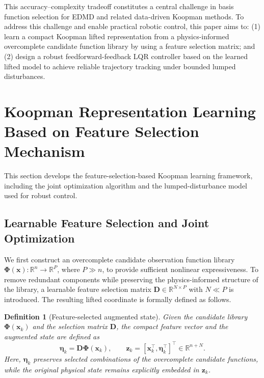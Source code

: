 \documentclass[letterpaper,10pt,conference]{ieeeconf}
\newtheorem{definition}{Definition}[section]
\newcommand{\R}{\mathbb{R}}
\newcommand{\x}{\mathbf{x}}
\newcommand{\z}{\mathbf{z}}
\newcommand{\Dmat}{\mathbf{D}}
\newcommand{\Phib}{\boldsymbol{\Phi}}
\begin{document}
This accuracy--complexity tradeoff constitutes a central challenge in basis function selection for EDMD and related data-driven Koopman methods. To address this challenge and enable practical robotic control, this paper aims to: (1) learn a compact Koopman lifted representation from a physics-informed overcomplete candidate function library by using a feature selection matrix; and (2) design a robust feedforward-feedback LQR controller based on the learned lifted model to achieve reliable trajectory tracking under bounded lumped disturbances.


\section{Koopman Representation Learning Based on Feature Selection Mechanism}
\label{sec:koopman}

This section develops the feature-selection-based Koopman learning framework, including the joint optimization algorithm and the lumped-disturbance model used for robust control.

\subsection{Learnable Feature Selection and Joint Optimization}
\label{subsec:algorithm}
We first construct an overcomplete candidate observation function library $\Phib(\x):\R^n\to\R^P$, where $P\gg n$, to provide sufficient nonlinear expressiveness. To remove redundant components while preserving the physics-informed structure of the library, a learnable feature selection matrix $\Dmat\in\R^{N\times P}$ with $N\ll P$ is introduced. The resulting lifted coordinate is formally defined as follows.

{
\begin{definition}[Feature-selected augmented state]
Given the candidate library $\Phib(\x_k)$ and the selection matrix $\Dmat$, the compact feature vector and the augmented state are defined as
\begin{equation}
\boldsymbol{\eta}_k = \Dmat\Phib(\x_k), \qquad
\z_k = [\x_k^\top, \boldsymbol{\eta}_k^\top]^\top \in \R^{n+N}.
\end{equation}
Here, $\boldsymbol{\eta}_k$ preserves selected combinations of the overcomplete candidate functions, while the original physical state remains explicitly embedded in $\z_k$.
\end{definition}
}
\end{document}
